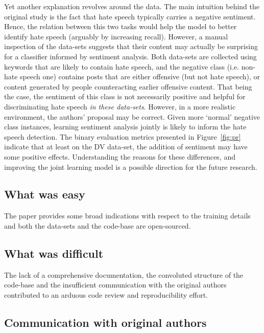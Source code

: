 Yet another explanation revolves around the data. The main intuition behind the original study is the fact that hate speech typically carries a negative sentiment. Hence, the relation between this two tasks would help the model to better identify hate speech (arguably by increasing recall). However, a manual inspection of the data-sets suggests that their content may actually be surprising for a classifier informed by sentiment analysis.
Both data-sets are collected using keywords that are likely to contain hate speech, and the negative class (i.e. non-hate speech one) contains posts that are either offensive (but not hate speech), or content generated by people counteracting earlier offensive content.
That being the case, the sentiment of this class is not necessarily positive and helpful for discriminating hate speech \emph{in these data-sets}. However, in a more realistic environment, the authors' proposal may be correct. Given more `normal' negative class instances, learning sentiment analysis jointly is likely to inform the hate speech detection.
The binary evaluation metrics presented in Figure~\ref{fig:pr} indicate that at least on the DV data-set, the addition of sentiment may have some positive effects. Understanding the reasons for these differences, and improving the joint learning model is a possible direction  for the future research.

\subsection{What was easy}

The paper provides some broad indications with respect to the training details and both the data-sets and the code-base are open-sourced.


\subsection{What was difficult}

The lack of a comprehensive documentation, the convoluted structure of the code-base and the insufficient
communication with the original authors contributed to an arduous code review and reproducibility effort.


\subsection{Communication with original authors}

